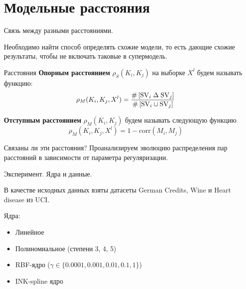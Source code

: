 \documentclass{beamer}
\begin{document}
\section{Модельные расстояния}
\begin{frame}{Связь между разными расстояниями.}

Необходимо найти способ определять схожие модели, то есть дающие схожие результаты, 
 чтобы не включать таковые в супермодель. 

\begin{block}{Расстояния}
	\textbf{Опорным расстоянием} $\rho_S(K_i, K_j)$ на выборке $X^l$ будем называть функцию:
$$
\rho_M(K_i, K_j, X^l) = \frac{\#\left[\mathrm{SV}_i \;\Delta\; \mathrm{SV}_j\right]}
{\#\left[\mathrm{SV}_i \cup \mathrm{SV}_j\right]}
$$

	\textbf{Отступным расстоянием} $\rho_M(K_i, K_j)$ будем называть следующую функцию
$$
\rho_M(K_i, K_j, X^l) = 1 - \mathrm{corr}(M_i, M_j)
$$	
\end{block}

Связаны ли эти расстояния? Проанализируем эволюцию распределения пар расстояний в зависимости от параметра регуляризации.

\end{frame}
\begin{frame}{Эксперимент. Ядра и данные.}

В качестве исходных данных взяты датасеты German Credits, Wine и Heart disease из UCI.

Ядра:

\begin{itemize}
    \item Линейное
    \item Полиномиальное (степени 3, 4, 5)
    \item RBF-ядро ($\gamma \in \{0.0001, 0.001, 0.01, 0.1, 1\}$)
    \item {INK-spline ядро}
\end{itemize}

    
\end{frame}
\end{document}
